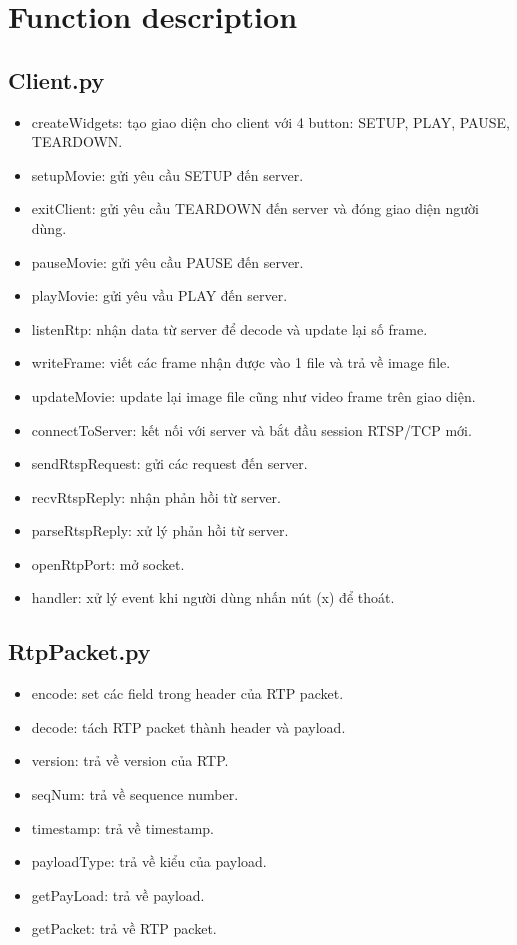 \documentclass[12pt,a4paper]{article}
\begin{document}
\section{Function description}
\subsection{Client.py}
\begin{itemize}
\item createWidgets: tạo giao diện cho client với 4 button: SETUP, PLAY, PAUSE, TEARDOWN.
\item setupMovie: gửi yêu cầu SETUP đến server.
\item exitClient: gửi yêu cầu TEARDOWN đến server và đóng giao diện người dùng.
\item pauseMovie: gửi yêu cầu PAUSE đến server.
\item playMovie: gửi yêu vầu PLAY đến server.
\item listenRtp: nhận data từ server để decode và update lại số frame.
\item writeFrame: viết các frame nhận được vào 1 file và trả về image file.
\item updateMovie:  update lại image file cũng như video frame trên giao diện.
\item connectToServer: kết nối với server và bắt đầu session RTSP/TCP mới.
\item sendRtspRequest: gửi các request đến server.
\item recvRtspReply: nhận phản hồi từ server. 
\item parseRtspReply: xử lý phản hồi từ server.
\item openRtpPort: mở socket.
\item handler: xử lý event khi người dùng nhấn nút (x) để thoát.
\end{itemize}
\subsection{RtpPacket.py}
\begin{itemize}
\item encode: set các field trong header của RTP packet.
\item decode: tách RTP packet thành header và payload.
\item version: trả về version của RTP.
\item seqNum: trả về sequence number.
\item timestamp: trả về timestamp.
\item payloadType: trả về kiểu của payload.
\item getPayLoad: trả về payload.
\item getPacket: trả về RTP packet.
\end{itemize}
\end{document}
